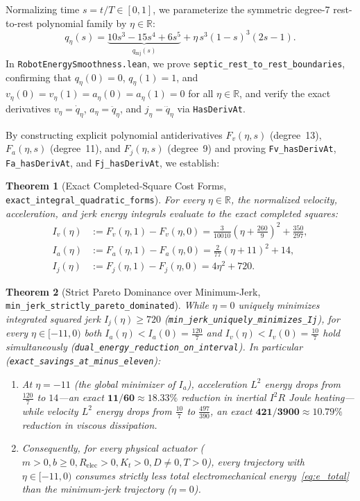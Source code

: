 \documentclass[10pt,twocolumn]{article}
\newtheorem{theorem}{Theorem}[section]
\theoremstyle{definition}
\begin{document}
Normalizing time $s = t/T \in [0, 1]$, we parameterize the symmetric degree-7 rest-to-rest polynomial family by $\eta \in \mathbb{R}$:
\begin{equation}
  q_\eta(s) = \underbrace{10s^3 - 15s^4 + 6s^5}_{q_{\text{mj}}(s)} + \eta\,s^3(1-s)^3(2s - 1).
\end{equation}
In \texttt{RobotEnergySmoothness.lean}, we prove \texttt{septic\_rest\_to\_rest\_boundaries}, confirming that $q_\eta(0)=0$, $q_\eta(1)=1$, and $v_\eta(0)=v_\eta(1)=a_\eta(0)=a_\eta(1)=0$ for all $\eta \in \mathbb{R}$, and verify the exact derivatives $v_\eta = \dot{q}_\eta$, $a_\eta = \ddot{q}_\eta$, and $j_\eta = \dddot{q}_\eta$ via \texttt{HasDerivAt}.

By constructing explicit polynomial antiderivatives $F_v(\eta, s)$ (degree~13), $F_a(\eta, s)$ (degree~11), and $F_j(\eta, s)$ (degree~9) and proving \texttt{Fv\_hasDerivAt}, \texttt{Fa\_hasDerivAt}, and \texttt{Fj\_hasDerivAt}, we establish:

\begin{theorem}[Exact Completed-Square Cost Forms, \texttt{exact\_integral\_quadratic\_forms}]
For every $\eta \in \mathbb{R}$, the normalized velocity, acceleration, and jerk energy integrals evaluate to the exact completed squares:
\begin{align}
  I_v(\eta) &:= F_v(\eta, 1) - F_v(\eta, 0) = \frac{3}{10010}\!\left(\eta + \frac{260}{9}\right)^{\!2} + \frac{350}{297}, \\
  I_a(\eta) &:= F_a(\eta, 1) - F_a(\eta, 0) = \frac{2}{77}(\eta + 11)^2 + 14, \\
  I_j(\eta) &:= F_j(\eta, 1) - F_j(\eta, 0) = 4\eta^2 + 720.
\end{align}
\end{theorem}

\begin{theorem}[Strict Pareto Dominance over Minimum-Jerk, \texttt{min\_jerk\_strictly\_pareto\_dominated}]
While $\eta = 0$ uniquely minimizes integrated squared jerk $I_j(\eta) \ge 720$ (\texttt{min\_jerk\_uniquely\_minimizes\_Ij}), for every $\eta \in [-11, 0)$ both $I_a(\eta) < I_a(0) = \frac{120}{7}$ and $I_v(\eta) < I_v(0) = \frac{10}{7}$ hold simultaneously (\texttt{dual\_energy\_reduction\_on\_interval}). In particular (\texttt{exact\_savings\_at\_minus\_eleven}):
\begin{enumerate}[leftmargin=1.4em,itemsep=1pt]
  \item At $\eta = -11$ (the global minimizer of $I_a$), acceleration $L^2$ energy drops from $\frac{120}{7}$ to $14$---an exact $\mathbf{11/60 \approx 18.33\%}$ reduction in inertial $I^2R$ Joule heating---while velocity $L^2$ energy drops from $\frac{10}{7}$ to $\frac{497}{390}$, an exact $\mathbf{421/3900 \approx 10.79\%}$ reduction in viscous dissipation.
  \item Consequently, for \emph{every} physical actuator ($m > 0, b \ge 0, R_{\text{elec}} > 0, K_t > 0, D \neq 0, T > 0$), every trajectory with $\eta \in [-11, 0)$ consumes strictly less total electromechanical energy~\eqref{eq:e_total} than the minimum-jerk trajectory ($\eta = 0$).
\end{enumerate}
\end{theorem}
\end{document}
